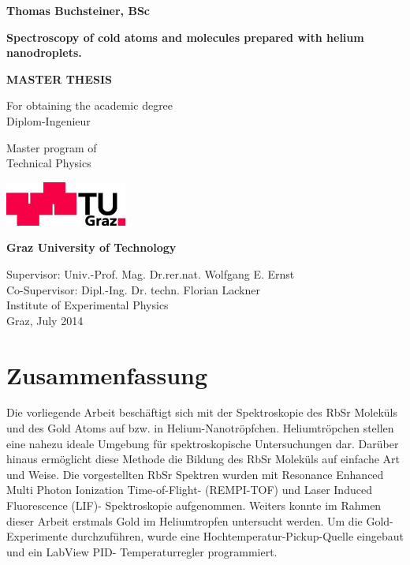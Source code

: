 \documentclass[parskip,12pt,headsepline,a4paper] {scrbook}
\begin{document}
\begin{titlepage}
\begin{center}
{\large \textbf{Thomas Buchsteiner, BSc}}

\vspace{1.5cm}

\begin{Large}
\textbf{Spectroscopy of cold atoms and molecules prepared with helium nanodroplets.}
\end{Large}

\vspace{1cm}

{\Large \textbf{MASTER THESIS}}

\vspace{0.5cm}

For obtaining the academic degree \\
Diplom-Ingenieur

\vspace{0.5cm}

Master program of \\
Technical Physics

\vspace{2cm}

\includegraphics{logo-tu.png}

\textbf{Graz University of Technology}

\vspace{1.5cm}

Supervisor: Univ.-Prof. Mag. Dr.rer.nat. Wolfgang E. Ernst \\
Co-Supervisor: Dipl.-Ing. Dr. techn. Florian Lackner\\
\vspace{0.5cm}
Institute of Experimental Physics\\
\vspace{1cm}
Graz, July 2014

\end{center}
\end{titlepage}

\frontmatter

\section*{Zusammenfassung}
\vspace{-0.5\baselineskip}
Die vorliegende Arbeit besch\"aftigt sich mit der Spektroskopie des RbSr Molek\"uls und des Gold Atoms auf bzw. in Helium-Nanotr\"opfchen. Heliumtr\"opchen stellen eine nahezu ideale Umgebung f\"ur spektroskopische Untersuchungen dar. Dar\"uber hinaus erm\"oglicht diese Methode die Bildung des RbSr Molek\"uls auf einfache Art und Weise. Die vorgestellten RbSr Spektren wurden mit Resonance Enhanced Multi Photon Ionization Time-of-Flight- (REMPI-TOF) und Laser Induced Fluorescence (LIF)- Spektroskopie aufgenommen. Weiters konnte im Rahmen dieser Arbeit erstmals Gold im Heliumtropfen untersucht werden. Um die Gold-Experimente durchzuf\"uhren, wurde eine Hochtemperatur-Pickup-Quelle eingebaut und ein LabView PID- Temperaturregler programmiert.
\end{document}

